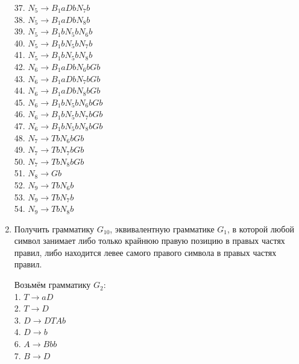 \documentclass[a4paper,14pt]{extarticle}
\begin{document}
\begin{enumerate}[1.]
37. $N_5 \rightarrow B_1aDbN_7b$\\
38. $N_5 \rightarrow B_1aDbN_8b$\\
39. $N_5 \rightarrow B_1bN_5bN_6b$\\
40. $N_5 \rightarrow B_1bN_5bN_7b$\\
41. $N_5 \rightarrow B_1bN_5bN_8b$\\
42. $N_6 \rightarrow B_1aDbN_6bGb$\\
43. $N_6 \rightarrow B_1aDbN_7bGb$\\
44. $N_6 \rightarrow B_1aDbN_8bGb$\\
45. $N_6 \rightarrow B_1bN_5bN_6bGb$\\
46. $N_6 \rightarrow B_1bN_5bN_7bGb$\\
47. $N_6 \rightarrow B_1bN_5bN_8bGb$\\
48. $N_7 \rightarrow TbN_6bGb$\\
49. $N_7 \rightarrow TbN_7bGb$\\
50. $N_7 \rightarrow TbN_8bGb$\\
51. $N_8 \rightarrow Gb$\\
52. $N_9 \rightarrow TbN_6b$\\
53. $N_9 \rightarrow TbN_7b$\\
54. $N_9 \rightarrow TbN_8b$\\

\item Получить грамматику $G_{10}$, эквивалентную грамматике $G_1$, в которой
любой символ занимает либо только крайнюю правую позицию в правых частях правил, 
либо находится левее самого правого символа в правых частях правил.

Возьмём грамматику $G_2$:\\
1. $T \rightarrow aD$\\
2. $T \rightarrow D$\\
3. $D \rightarrow DTAb$\\
4. $D \rightarrow b$\\
6. $A \rightarrow Bbb$\\
7. $B \rightarrow D$\\


\end{enumerate}
\end{document}
